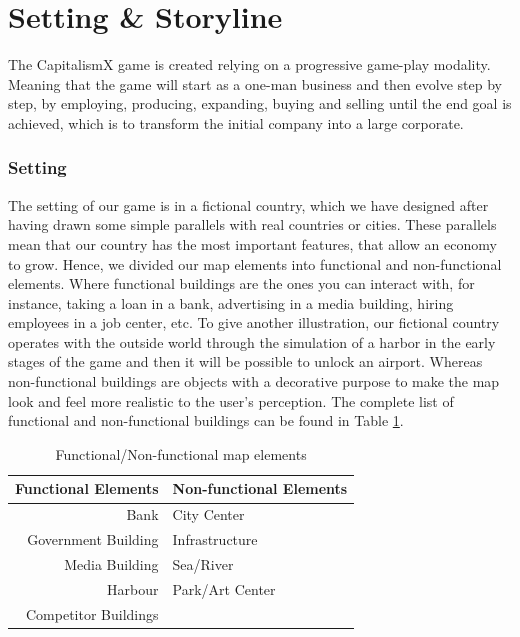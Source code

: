 \documentclass[11pt,titlepage,oneside,openany]{book}
\begin{document}
\section{Setting \& Storyline}
\label{SettingStory}
The CapitalismX game is created relying on a progressive game-play modality. Meaning that the game will start as a one-man business and then evolve step by step, by employing, producing, expanding, buying and selling  until the end goal is achieved, which is to transform the initial company into a large corporate. 
\subsubsection{Setting}
The setting of our game is in a fictional country, which we have designed after having drawn some simple parallels with real countries or cities. These parallels mean that our country has the most important features, that allow an economy to grow. Hence, we divided our map elements into functional and non-functional elements. Where functional buildings are the ones you can interact with, for instance, taking a loan in a bank, advertising in a media building, hiring employees in a job center, etc.  To give another illustration, our fictional country operates with the outside world through the simulation of a harbor in the early stages of the game and then it will be possible to unlock an airport. Whereas non-functional buildings are objects with a decorative purpose to make the map look and feel  more realistic to the user’s perception. The complete list of functional and non-functional buildings can be found in Table \ref{table:map-el}. 

\begin{table}[ht]
\centering
\begin{tabular}{r|l}
\hline 
 Functional Elements & Non-functional Elements\\
\hline \hline
 Bank & City Center  \\
 Government Building & Infrastructure \\
 Media Building & Sea/River \\
 Harbour & Park/Art Center  \\
 Competitor Buildings & \\
\hline
\end{tabular}
\caption{Functional/Non-functional map elements}
\label{table:map-el}
\end{table}
\end{document}
